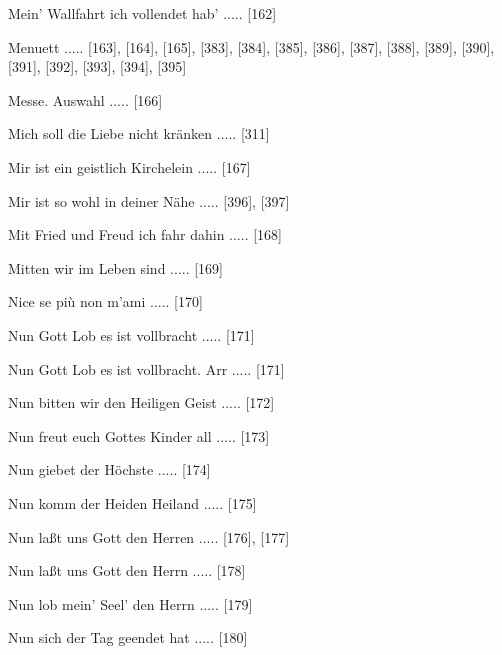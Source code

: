 \documentclass[twocolumn]{book}
\begin{document}
\newline 
Mein' Wallfahrt ich vollendet hab' ..... [162]

\newline 
Menuett ..... [163], [164], [165], [383], [384], [385], [386], [387], [388], [389], [390], [391], [392], [393], [394], [395]

\newline 
Messe. Auswahl ..... [166]

\newline 
Mich soll die Liebe nicht kränken ..... [311]

\newline 
Mir ist ein geistlich Kirchelein ..... [167]

\newline 
Mir ist so wohl in deiner Nähe ..... [396], [397]

\newline 
Mit Fried und Freud ich fahr dahin ..... [168]

\newline 
Mitten wir im Leben sind ..... [169]

\newline 
Nice se più non m'ami ..... [170]

\newline 
Nun Gott Lob es ist vollbracht ..... [171]

\newline 
Nun Gott Lob es ist vollbracht. Arr ..... [171]

\newline 
Nun bitten wir den Heiligen Geist ..... [172]

\newline 
Nun freut euch Gottes Kinder all ..... [173]

\newline 
Nun giebet der Höchste ..... [174]

\newline 
Nun komm der Heiden Heiland ..... [175]

\newline 
Nun laßt uns Gott den Herren ..... [176], [177]

\newline 
Nun laßt uns Gott den Herrn ..... [178]

\newline 
Nun lob mein' Seel' den Herrn ..... [179]

\newline 
Nun sich der Tag geendet hat ..... [180]
\end{document}
